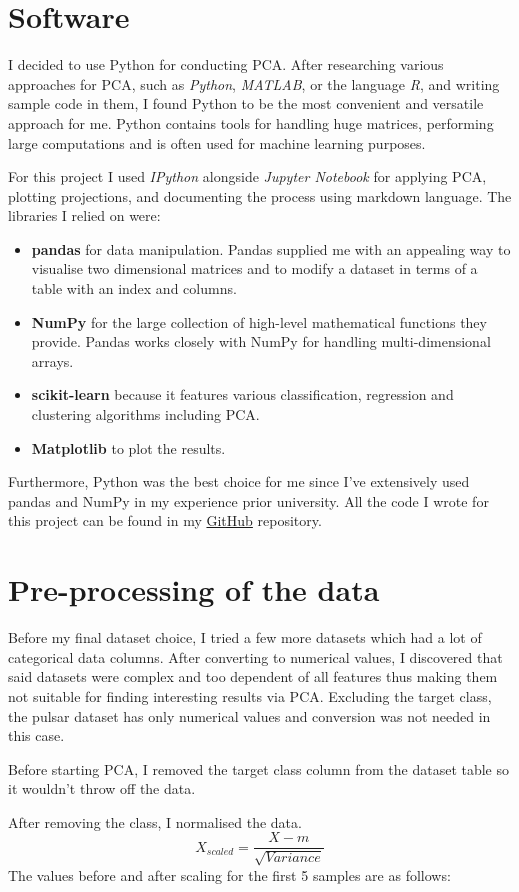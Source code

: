 \documentclass[a4paper,12pt]{article}
\begin{document}
    \section{Software}
    I decided to use Python for conducting PCA. After researching various approaches for PCA, such as \textit{Python}, \textit{MATLAB}, or the language \textit{R}, and writing sample code in them, I found Python to be the most convenient and versatile approach for me. Python contains tools for handling huge matrices, performing large computations and is often used for machine learning purposes.\par
    For this project I used \textit{IPython} alongside \textit{Jupyter Notebook} for applying PCA, plotting projections, and documenting the process using markdown language. The libraries I relied on were:
    \begin{itemize}
        \item \textbf{pandas} for data manipulation. Pandas supplied me with an appealing way to visualise two dimensional matrices and to modify a dataset in terms of a table with an index and columns.
        \item \textbf{NumPy} for the large collection of high-level mathematical functions they provide. Pandas works closely with NumPy for handling multi-dimensional arrays.
        \item \textbf{scikit-learn} because it features various classification, regression and clustering algorithms including PCA.
        \item \textbf{Matplotlib} to plot the results.
    \end{itemize}
    Furthermore, Python was the best choice for me since I've extensively used pandas and NumPy in my experience prior university. All the code I wrote for this project can be found in my \href{https://github.com/MarchiT/pulsar-pca}{GitHub} repository.
    \newpage

    \section{Pre-processing of the data}
    Before my final dataset choice, I tried a few more datasets which had a lot of categorical data columns. After converting to numerical values, I discovered that said datasets were complex and too dependent of all features thus making them not suitable for finding interesting results via PCA. Excluding the target class, the pulsar dataset has only numerical values and conversion was not needed in this case.\par
    Before starting PCA, I removed the target class column from the dataset table so it wouldn't throw off the data.\par
    After removing the class, I normalised the data.
    \[X_{scaled} = \frac{X - m}{\sqrt{Variance}}\]
    The values before and after scaling for the first 5 samples are as follows:
\end{document}
